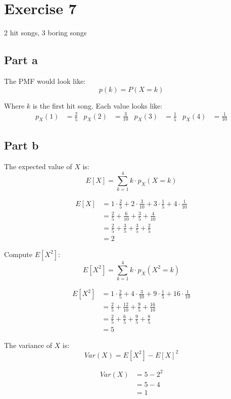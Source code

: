 \section{Exercise 7}
2 hit songs, 3 boring songs
\subsection{Part a}
The PMF would look like:
\[
	p(k)=P(X=k)
\]

Where $k$ is the first hit song. Each value looks like:
\begin{align*}
	p_X(1) & = \frac{2}{5}  &
	p_X(2) & = \frac{3}{10} &
	p_X(3) & = \frac{1}{5}  &
	p_X(4) & = \frac{1}{10}
\end{align*}

\subsection{Part b}
The expected value of $X$ is:
\[
	E[X] = \sum_{k=1}^{4} k \cdot p_X(X=k)
\]

\begin{align*}
	E[X] & = 1 \cdot \frac{2}{5} + 2 \cdot \frac{3}{10} + 3 \cdot \frac{1}{5} + 4 \cdot \frac{1}{10} \\
	     & = \frac{2}{5} + \frac{6}{10} + \frac{3}{5} + \frac{4}{10}                                 \\
	     & = \frac{2}{5} + \frac{3}{5} + \frac{3}{5} + \frac{2}{5}                                   \\
	     & = 2
\end{align*}

Compute $E[X^2]$:
\[
	E[X^2] = \sum_{k=1}^{4} k \cdot p_X(X^2=k)
\]

\begin{align*}
	E[X^2] & = 1 \cdot \frac{2}{5} + 4 \cdot \frac{3}{10} + 9 \cdot \frac{1}{5} + 16 \cdot \frac{1}{10} \\
	       & = \frac{2}{5} + \frac{12}{10} + \frac{9}{5} + \frac{16}{10}                                \\
	       & = \frac{2}{5} + \frac{6}{5} + \frac{9}{5} + \frac{8}{5}                                    \\
	       & = 5
\end{align*}

The variance of $X$ is:
\[
	Var(X) = E[X^2] - E[X]^2
\]

\begin{align*}
	Var(X) & = 5 - 2^2 \\
	       & = 5 - 4   \\
	       & = 1
\end{align*}

